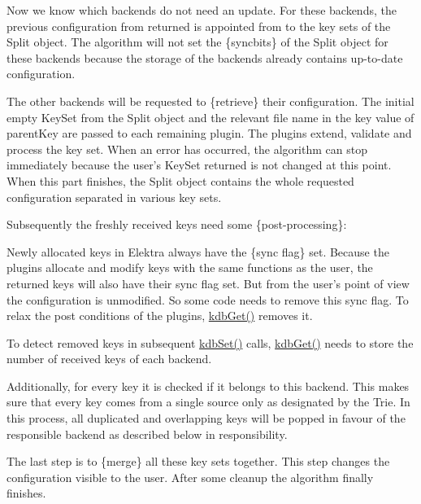 Now we know which backends do not need an update. For these backends, the previous configuration from {\ttfamily returned} is appointed from to the key sets of the {\ttfamily Split} object. The algorithm will not set the \{syncbits\} of the {\ttfamily Split} object for these backends because the storage of the backends already contains up-\/to-\/date configuration.

The other backends will be requested to \{retrieve\} their configuration. The initial empty {\ttfamily Key\+Set} from the {\ttfamily Split} object and the relevant file name in the key value of {\ttfamily parent\+Key} are passed to each remaining plugin. The plugins extend, validate and process the key set. When an error has occurred, the algorithm can stop immediately because the user's {\ttfamily Key\+Set} {\ttfamily returned} is not changed at this point. When this part finishes, the {\ttfamily Split} object contains the whole requested configuration separated in various key sets.

Subsequently the freshly received keys need some \{post-\/processing\}\+:


\begin{DoxyItemize}
\item Newly allocated keys in Elektra always have the \{sync flag\} set. Because the plugins allocate and modify keys with the same functions as the user, the returned keys will also have their sync flag set. But from the user's point of view the configuration is unmodified. So some code needs to remove this sync flag. To relax the post conditions of the plugins, {\ttfamily \hyperlink{group__kdb_ga28e385fd9cb7ccfe0b2f1ed2f62453a1}{kdb\+Get()}} removes it.
\item To detect removed keys in subsequent {\ttfamily \hyperlink{group__kdb_ga11436b058408f83d303ca5e996832bcf}{kdb\+Set()}} calls, {\ttfamily \hyperlink{group__kdb_ga28e385fd9cb7ccfe0b2f1ed2f62453a1}{kdb\+Get()}} needs to store the number of received keys of each backend.
\item Additionally, for every key it is checked if it belongs to this backend. This makes sure that every key comes from a single source only as designated by the {\ttfamily Trie}. In this process, all duplicated and overlapping keys will be popped in favour of the responsible backend as described below in responsibility.
\end{DoxyItemize}

The last step is to \{merge\} all these key sets together. This step changes the configuration visible to the user. After some cleanup the algorithm finally finishes.

